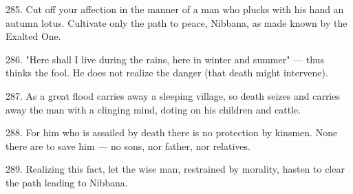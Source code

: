 285. Cut off your affection in the manner of a man who plucks with his hand an autumn lotus. Cultivate only the path to peace, Nibbana, as made known by the Exalted One.

286. "Here shall I live during the rains, here in winter and summer" — thus thinks the fool. He does not realize the danger (that death might intervene).

287. As a great flood carries away a sleeping village, so death seizes and carries away the man with a clinging mind, doting on his children and cattle.

288. For him who is assailed by death there is no protection by kinsmen. None there are to save him — no sons, nor father, nor relatives.

289. Realizing this fact, let the wise man, restrained by morality, hasten to clear the path leading to Nibbana.
